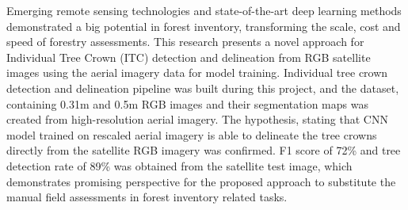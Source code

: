 Emerging remote sensing technologies and state-of-the-art deep learning methods demonstrated a big potential in forest inventory, transforming the scale, cost and speed of forestry assessments. This research presents a novel approach for Individual Tree Crown (\gls{ITC}) detection and delineation from RGB satellite images using the aerial imagery data for model training. Individual tree crown detection and delineation pipeline was built during this project, and the dataset, containing 0.31m and 0.5m RGB images and their segmentation maps was created from high-resolution aerial imagery. The hypothesis, stating that CNN model trained on rescaled aerial imagery is able to delineate the tree crowns directly from the satellite RGB imagery was confirmed. F1 score of 72\% and tree detection rate of 89\% was obtained from the satellite test image, which demonstrates promising perspective for the proposed approach to substitute the manual field assessments in forest inventory related tasks.